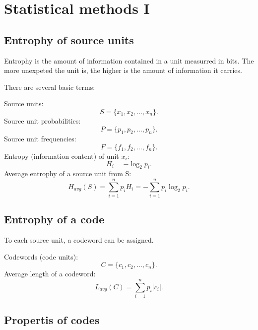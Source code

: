 \chapter{Statistical methods I}

\section{Entrophy of source units}

Entrophy is the amount of information contained in a unit measurred in bits. The more unexpeted the unit is, the higher is the amount of information it carries.

There are several basic terms:

\noindent
Source units:
$$S = \{x_1, x_2, \ldots, x_n\}.$$
Source unit probabilities:
$$P = \{p_1, p_2, \ldots, p_n\}.$$
Source unit frequencies:
$$F = \{f_1, f_2, \ldots, f_n\}.$$
Entropy (information content) of unit $x_i$:
$$ H_i = - \log_2 p_i.$$
Average entrophy of a source unit from S:
$$H_{avg}(S) = \sum_{i=1}^{n}{p_i H_i} = -\sum_{i=1}^{n}{p_i \log_2 p_i}.$$





\section{Entrophy of a code}
To each source unit, a codeword can be assigned. 

\noindent
Codewords (code units):
$$C = \{c_1, c_2, \ldots, c_n\}.$$
Average length of a codeword:
$$L_{avg}(C) = \sum_{i=1}^{n}{p_i |c_i|}.$$

\section{Propertis of codes}

